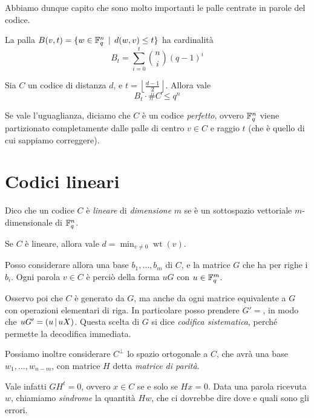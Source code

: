 \documentclass[a4paper]{book}
\DeclareMathOperator{\wt}{wt}
\begin{document}
    Abbiamo dunque capito che sono molto importanti le palle centrate in parole del codice.

    \begin{oss}
        La palla $B(v,t)=\{w\in\mathbb{F}_q^n\operatorname{\; |\;} d(w,v)\le t \}$ ha cardinalità $$B_t=\sum_{i=0}^t \binom{n}{i}(q-1)^i$$
    \end{oss}

    \begin{proposition}
        Sia $C$ un codice di distanza $d$, e $t=\left\lfloor \frac{d-1}{2} \right\rfloor$. Allora vale $$B_t\cdot \#C\le q^n$$
    \end{proposition}
    \begin{definition}
        Se vale l'uguaglianza, diciamo che $C$ è un codice \emph{perfetto}, ovvero $\mathbb{F}_q^n$ viene partizionato completamente dalle palle di centro $v\in C$ e raggio $t$ (che è quello di cui sappiamo correggere).
    \end{definition}

    \section{Codici lineari}
    Dico che un codice $C$ è \emph{lineare} di \emph{dimensione} $m$ se è un sottospazio vettoriale $m$-dimensionale di $\mathbb{F}_q^n$.

    \begin{oss}
        Se $C$ è lineare, allora vale $d=\min_{v\neq0}\wt(v)$.
    \end{oss}

    Posso considerare allora una base $b_1,\dots, b_m$ di $C$, e la matrice $G$ che ha per righe i $b_i$. Ogni parola $v\in C$ è perciò della forma $uG$ con $u\in\mathbb{F}_q^m$.

    Osservo poi che $C$ è generato da $G$, ma anche da ogni matrice equivalente a $G$ con operazioni elementari di riga. In particolare posso prendere $G'=$, in modo che $uG'=(u\;\vline\; uX)$. Questa scelta di $G$ si dice \emph{codifica sistematica}, perché permette la decodifica immediata.

    \medskip
    Possiamo inoltre considerare $C^\perp$ lo spazio ortogonale a $C$, che avrà una base $w_1,\dots, w_{n-m}$, con matrice $H$ detta \emph{matrice di parità}.

    Vale infatti $GH^t=0$, ovvero $x\in C$ se e solo se $Hx=0$. Data una parola ricevuta $w$, chiamiamo \emph{sindrome} la quantità $Hw$, che ci dovrebbe dire dove e quali sono gli errori.
\end{document}
